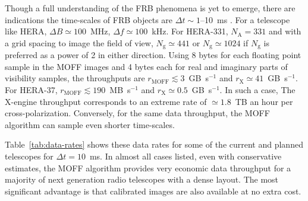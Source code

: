\documentclass[a4paper,fleqn,usenatbib]{mnras}
\newcommand{\Nant}{N_\textrm{A}}
\newcommand{\Ngrid}{N_\textrm{g}}
\begin{document}
Though a full understanding of the FRB phenomena is yet to emerge, there are 
indications the time-scales of FRB objects are $\Delta t \sim 1$--10~ms 
\citep{tho13}. For a telescope like HERA, $\Delta B \simeq 100$~MHz, 
$\Delta f \simeq 100$~kHz. For HERA-331, $\Nant=331$ and with a grid 
spacing to image the field of view, $\Ngrid \simeq 441$ or 
$\Ngrid \simeq 1024$ if $\Ngrid$ is preferred as a power of 2 in either 
direction. Using 8 bytes for each floating point sample in the MOFF images and 
4 bytes each for real and imaginary parts of visibility samples, the throughputs 
are $r_\textrm{MOFF} \lesssim 3$~GB~s$^{-1}$ and 
$r_\textrm{X} \simeq 41$~GB~s$^{-1}$. For HERA-37, 
$r_\textrm{MOFF} \lesssim 190$~MB~s$^{-1}$ and 
$r_\textrm{X} \simeq 0.5$~GB~s$^{-1}$. In such a case, The X-engine throughput 
corresponds to an extreme rate of $\simeq 1.8$~TB an hour per 
cross-polarization. Conversely, for the same data throughput, the MOFF algorithm 
can sample even shorter time-scales. 

Table~\ref{tab:data-rates} shows these data rates for some of the current and 
planned telescopes for $\Delta t=10$~ms. In almost all cases listed, even with 
conservative estimates, the MOFF algorithm provides very economic data 
throughput for a majority of next generation radio telescopes with a dense 
layout. The most significant advantage is that calibrated images are also 
available at no extra cost.
\end{document}
